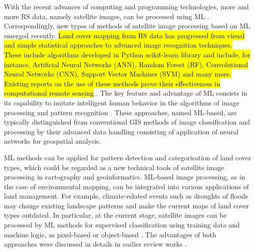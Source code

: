 \documentclass[12pt,a4paper,oneside]{article}
\def \newpar{\vspace{6pt}}
\begin{document}
\newpar With the recent advances of computing and programming technologies, more and more RS data, namely satellite images, can be processed using ML \citep{BELMAHDI2023100906,Lemenkova202021,GOMEZ201929}. Correspondingly, new types of methods of satellite image processing based on ML emerged recently. \hl{Land cover mapping from RS data has progressed from visual and simple statistical approaches to advanced image recognition techniques. These include algorithms developed in Python scikit-learn library and include, for instance, Artificial Neural Networks (ANN), Random Forest (RF), Convolutional Neural Networks (CNN), Support Vector Machines (SVM) and many more. Existing reports on the use of these methods prove their effectiveness in computational remote sensing } \citep{Lemenkova202411,GAWUSU2024100065,Lemenkova202410,NENKAM2024117007}. The key feature and advantage of ML consists in its capability to imitate intelligent human behavior in the algorithms of image processing and pattern recognition \citep{EBRAHIMY2023103390,PANDE2024141035,Lemenkova202217}. These approaches, named ML-based, are typically distinguished from conventional GIS methods of image classification and processing by their advanced data handling consisting of application of neural networks for geospatial analysis. 

\newpar ML methods can be applied for pattern detection and categorisation of land cover types, which could be regarded as a new technical tools of satellite image processing in cartography and geoinformatics. ML-based image processing, as in the case of environmental mapping, can be integrated into various applications of land management. For example, climate-related events such as droughts of floods may change existing landscape patterns and make the current maps of land cover types outdated. In particular, at the current stage, satellite images can be processed by ML methods for supervised classification using training data and machine logic, as pixel-based \citep{RAHMAN2020100410,AYOADE2023337} or object-based \citep{KARILA2023100046,Lemenkova202024,Lemenkova201528}. The advantages of both approaches were discussed in details in earlier review works \citep{NASIRI2023103555,ABUJAYYAB2023101802}. 
\end{document}
